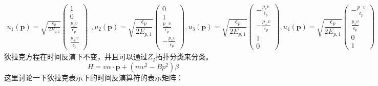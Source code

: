 \documentclass{article}
\numberwithin{equation}{subsection}
\newcommand{\p}{\mathbf{p}}
\begin{document}
\begin{equation}
    \begin{split}
        u_1(\p)=\sqrt{\frac{\epsilon_p}{2E_{p,1}}}\begin{pmatrix}
            1\\
            0\\
            \frac{p_zv}{\epsilon_p}\\
            \frac{p_+v}{\epsilon_{p}}
        \end{pmatrix}
    \end{split},u_2(\p)=\sqrt{\frac{\epsilon_p}{2E_{p,1}}}\begin{pmatrix}
        0\\
        1\\
        \frac{p_-v}{\epsilon_p}\\
        -\frac{p_zv}{\epsilon_p}
    \end{pmatrix},u_3(\p)=\sqrt{\frac{\epsilon_p}{2E_{p,1}}}\begin{pmatrix}
        -\frac{p_zv}{\epsilon_p}\\
        -\frac{p_+v}{\epsilon_p}\\
        1\\
        0
    \end{pmatrix},u_4(\p)=\sqrt{\frac{\epsilon_p}{2E_{p,1}}}\begin{pmatrix}
        -\frac{p_-v}{\epsilon_p}\\
        \frac{p_zv}{\epsilon_p}\\
        0\\
        1
    \end{pmatrix}
\end{equation}
狄拉克方程在时间反演下不变，并且可以通过$Z_2$拓扑分类来分类。
\begin{equation}
    H=v\alpha\cdot\mathbf{p}+(mv^2-Bp^2)\beta
\end{equation}
这里讨论一下狄拉克表示下的时间反演算符的表示矩阵：
\end{document}
